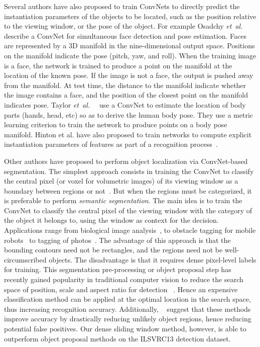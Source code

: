 \documentclass{article} %
\def\etal{{\textit{et~al.~}}}
\begin{document}
Several authors have also proposed to train ConvNets to directly
predict the instantiation parameters of the objects to be located,
such as the position relative to the viewing window, or the pose of
the object. For example Osadchy \etal~\cite{osadchy-07} describe a
ConvNet for simultaneous face detection and pose estimation. Faces are
represented by a 3D manifold in the nine-dimensional output
space. Positions on the manifold indicate the pose (pitch, yaw, and
roll). When the training image is a face, the network is trained to
produce a point on the manifold at the location of the known pose. If
the image is not a face, the output is pushed away from the manifold.
At test time, the distance to the manifold indicate whether the image
contains a face, and the position of the closest point on the manifold
indicates pose.
Taylor \etal~\cite{taylor-nips-11,taylor-cvpr-11}
use a ConvNet to estimate the location of body parts (hands, head,
etc) so as to derive the human body pose. They use a metric learning
criterion to train the network to produce points on a body pose
manifold.
Hinton et al. have also proposed to train networks to
compute explicit instantiation parameters of features as part of a
recognition process~\cite{hinton2011transforming}.

Other authors have proposed to perform object localization via
ConvNet-based segmentation. The simplest approach consists in training
the ConvNet to classify the central pixel (or voxel for volumetric
images) of its viewing window as a boundary between regions or
not~\cite{jain-iccv-07}. But when the regions must be categorized, it
is preferable to perform {\em semantic segmentation}. The main idea
is to train the ConvNet to classify the central pixel of the viewing
window with the category of the object it belongs to, using the window
as context for the decision. Applications range from biological image
analysis~\cite{ning-05}, to obstacle tagging for mobile
robots~\cite{hadsell-jfr-09} to tagging of
photos~\cite{farabet-pami-13}. The advantage of this approach is that
the bounding contours need not be rectangles, and the regions need not
be well-circumscribed objects. The disadvantage is that it requires
dense pixel-level labels for training.
This segmentation pre-processing or object proposal step has recently gained popularity
in traditional computer vision to reduce the search space of
position, scale and aspect ratio for detection
~\cite{manen2013prime,cpmc-release1,endres2010category,UijlingsIJCV2013}.
Hence an expensive
classification method can be applied at the optimal location in the search
space, thus increasing recognition accuracy.
Additionally, ~\cite{UijlingsIJCV2013,carreira2012object} suggest
that these methods improve accuracy by drastically reducing
unlikely object regions, hence reducing potential false positives.
Our dense sliding window method, however, is able to outperform
object proposal methods on the ILSVRC13 detection dataset.
\end{document}
